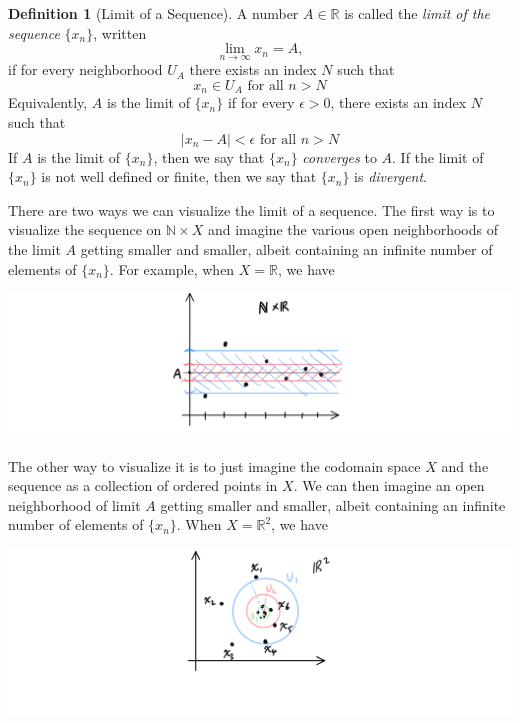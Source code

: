 \documentclass{article}
\theoremstyle{remark}
\theoremstyle{definition}
\newtheorem{definition}{Definition}[section]
\begin{document}
\begin{definition}[Limit of a Sequence]
A number $A \in \mathbb{R}$ is called the \textit{limit of the sequence} $\{x_n\}$, written 
\[ \lim_{n \rightarrow \infty} x_n = A,\]
if for every neighborhood $U_A$ there exists an index $N$ such that 
\[x_n \in U_A \text{ for all } n > N\]
Equivalently, $A$ is the limit of $\{x_n\}$ if for every $\epsilon>0$, there exists an index $N$ such that
\[ |x_n - A| < \epsilon \text{ for all } n > N\]
If $A$ is the limit of $\{x_n\}$, then we say that $\{x_n\}$ \textit{converges} to $A$. If the limit of $\{x_n\}$ is not well defined or finite, then we say that $\{x_n\}$ is \textit{divergent}. 

There are two ways we can visualize the limit of a sequence. The first way is to visualize the sequence on $\mathbb{N} \times X$ and imagine the various open neighborhoods of the limit $A$ getting smaller and smaller, albeit containing an infinite number of elements of $\{x_n\}$. For example, when $X = \mathbb{R}$, we have
\begin{center}
  \includegraphics[scale=0.33]{img/Limit_Sequence_R1.PNG}
\end{center}
The other way to visualize it is to just imagine the codomain space $X$ and the sequence as a collection of ordered points in $X$. We can then imagine an open neighborhood of limit $A$ getting smaller and smaller, albeit containing an infinite number of elements of $\{x_n\}$. When $X = \mathbb{R}^2$, we have
\begin{center}
    \includegraphics[scale=0.33]{img/Limit_Sequence_R2.PNG}
\end{center}
\end{definition}
\end{document}

